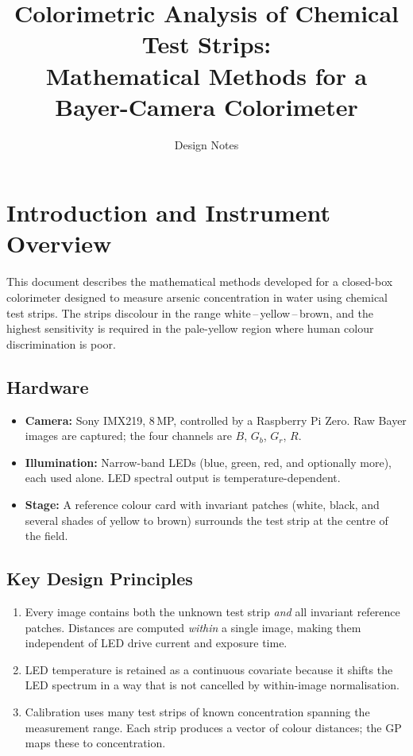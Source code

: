 \documentclass[11pt, a4paper]{article}
\title{%
  Colorimetric Analysis of Chemical Test Strips:\\
  Mathematical Methods for a Bayer-Camera Colorimeter}
\author{Design Notes}
\date{}
\begin{document}
\maketitle
\tableofcontents
\newpage

\section{Introduction and Instrument Overview}

This document describes the mathematical methods developed for a
closed-box colorimeter designed to measure arsenic concentration in
water using chemical test strips.  The strips discolour in the range
white\,--\,yellow\,--\,brown, and the highest sensitivity is required
in the pale-yellow region where human colour discrimination is poor.

\subsection{Hardware}

\begin{itemize}[nosep]
  \item \textbf{Camera:} Sony IMX219, 8\,MP, controlled by a Raspberry Pi Zero.
    Raw Bayer images are captured; the four channels are
    $B$, $G_b$, $G_r$, $R$.
  \item \textbf{Illumination:} Narrow-band LEDs (blue, green, red, and
    optionally more), each used alone.  LED spectral output is
    temperature-dependent.
  \item \textbf{Stage:} A reference colour card with invariant patches
    (white, black, and several shades of yellow to brown) surrounds the
    test strip at the centre of the field.
\end{itemize}

\subsection{Key Design Principles}

\begin{enumerate}[nosep]
  \item Every image contains both the unknown test strip \emph{and} all
    invariant reference patches.  Distances are computed
    \emph{within} a single image, making them independent of LED
    drive current and exposure time.
  \item LED temperature is retained as a continuous covariate because
    it shifts the LED spectrum in a way that is not cancelled by
    within-image normalisation.
  \item Calibration uses many test strips of known concentration spanning
    the measurement range.  Each strip produces a vector of colour
    distances; the GP maps these to concentration.
\end{enumerate}
\end{document}
